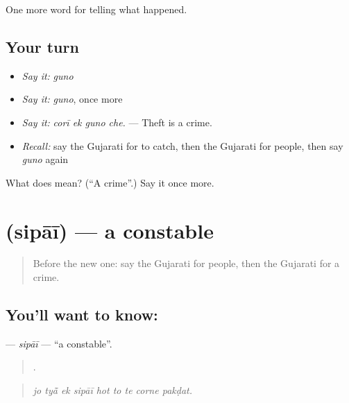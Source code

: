 \begin{grammarlens}[title={What you've built}]
One more word for telling what happened.
\end{grammarlens}

\subsection*{Your turn}
\begin{itemize}
\raggedright
  \item \emph{Say it:} \emph{guno}
  \item \emph{Say it:} \emph{guno}, once more
  \item \emph{Say it:} \emph{corī ek guno che.} — Theft is a crime.
  \item \emph{Recall:} say the Gujarati for to catch, then the Gujarati for people, then say \emph{guno} again
\end{itemize}

\begin{tcolorbox}[breakable,colback=teal!4,colframe=teal!35!black,title={Before you move on}]
What does  mean? (\textquotedblleft{}A crime\textquotedblright{}.) Say it once more.
\end{tcolorbox}
\section[\texorpdfstring{\gu{સિપાઈ} (sipāī)}{સિપાઈ (sipāī)}]{ (sipāī) — a constable}

\label{lesson:GU-C286-sipai}



\begin{quote}
Before the new one: say the Gujarati for people, then the Gujarati for a crime.
\end{quote}

\subsection*{You'll want to know: }
\textbf{} — \emph{sipāī} — \textquotedblleft{}a constable\textquotedblright{}.

\begin{quote}
        .
\end{quote}

\begin{quote}
\emph{jo tyā̃ ek sipāī hot to te corne pakḍat.}
\end{quote}

